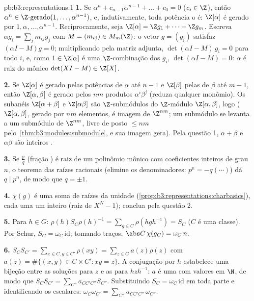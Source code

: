 \begin{solution}{pb:b3:representations:1}
\textbf{1.} Se $\alpha^n + c_{n-1}\alpha^{n-1} + \dots + c_0 =
0$ ($c_i \in \Z$), então $\alpha^n \in \Z\text{-gerado}(1, \dots,
\alpha^{n-1})$, e, indutivamente, toda potência o é: $\Z[\alpha]$ é
gerado por $1, \alpha, \dots, \alpha^{n-1}$. Reciprocamente, seja
$\Z[\alpha] = \Z g_1 + \dots + \Z g_m$. Escreva $\alpha g_i =
\sum_j m_{ij}g_j$ com $M = (m_{ij}) \in M_m(\Z)$: o vetor
$g = (g_i)$ satisfaz $(\alpha I - M)g = 0$; multiplicando pela
matriz adjunta, $\det(\alpha I - M)\,g_i = 0$ para todo $i$,
e, como $1 \in \Z[\alpha]$ é uma $\Z$-combinação dos
$g_i$, $\det(\alpha I - M) = 0$: $\alpha$ é raiz do
mônico $\det(XI - M) \in \Z[X]$.

\textbf{2.} Se $\Z[\alpha]$ é gerado pelas potências de $\alpha$ até
$n-1$ e $\Z[\beta]$ pelas de $\beta$ até $m - 1$, então
$\Z[\alpha,\beta]$ é gerado pelos $nm$ produtos
$\alpha^i\beta^j$ (reduza qualquer monômio). Os subanéis
$\Z[\alpha + \beta]$ e $\Z[\alpha\beta]$ são $\Z$-submódulos
do $\Z$-módulo  $\Z[\alpha, \beta]$,
logo  ($\Z[\alpha,\beta]$, gerado por
$nm$ elementos, é imagem de $\Z^{nm}$; um submódulo se levanta
a um submódulo de $\Z^{nm}$, livre de posto $\leq nm$ pelo~\cref{thm:b3:modules:submodule}, e sua imagem gera). Pela
questão 1, $\alpha + \beta$ e $\alpha\beta$ são inteiros
.

\textbf{3.} Se $\frac pq$ (fração ) é raiz de um polinômio mônico
com coeficientes inteiros de grau $n$, o teorema das raízes racionais
(elimine os denominadores: $p^n = -q(\cdots)$) dá $q \mid p^n$,
de modo que $q = \pm1$.

\textbf{4.} $\chi(g)$ é uma soma de raízes da unidade
(\cref{prop:b3:representations:charbasics}), cada uma um inteiro
 (raiz de $X^N - 1$); conclua pela questão 2.

\textbf{5.} Para $h \in G$: $\rho(h)S_C\rho(h)^{-1} = \sum_{g\in
C}\rho(hgh^{-1}) = S_C$ ($C$ é uma classe). Por Schur, $S_C =
\omega_C\,\mathrm{id}$; tomando traços, $\abs C\,\chi(g_C) =
\omega_C\, n$.

\textbf{6.} $S_CS_{C'} = \sum_{x \in C, y \in C'}\rho(xy) =
\sum_{z \in G} a(z)\rho(z)$ com $a(z) = \#\{(x,y) \in C\times
C' : xy = z\}$. A conjugação por $h$ estabelece uma bijeção entre as soluções para
$z$ e as para $hzh^{-1}$: $a$ é uma  com
valores em $\N$, de modo que $S_CS_{C'} = \sum_{C''}a_{CC'C''}S_{C''}$.
Substituindo $S_C = \omega_C\,\mathrm{id}$ em toda parte e
identificando os escalares:
$\omega_C\omega_{C'} = \sum_{C''}a_{CC'C''}\,\omega_{C''}$.


\end{solution}
